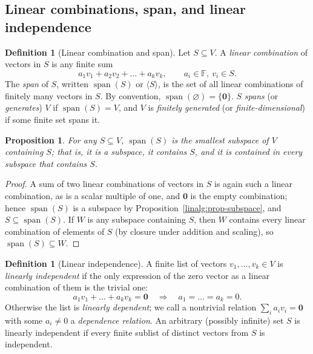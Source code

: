 \documentclass[11pt,a4paper]{article}
\newtheorem{proposition}[theorem]{Proposition}
\theoremstyle{definition}
\newtheorem{definition}[theorem]{Definition}
\theoremstyle{remark}
\newcommand{\F}{\ensuremath{\mathbb{F}}}
\begin{document}
\subsection{Linear combinations, span, and linear independence}\label{linalg:subsec-span}

\begin{definition}[Linear combination and span]\label{linalg:def-span}
Let \(S \subseteq V\). A \emph{linear combination} of vectors in \(S\) is any finite sum
\[
a_1 v_1 + a_2 v_2 + \dots + a_k v_k, \qquad a_i \in \F,\ v_i \in S.
\]
The \emph{span} of \(S\), written \(\operatorname{span}(S)\) or \(\langle S\rangle\), is the set of all linear combinations of finitely many vectors in \(S\). By convention, \(\operatorname{span}(\varnothing) = \{\mathbf 0\}\). \(S\) \emph{spans} (or \emph{generates}) \(V\) if \(\operatorname{span}(S) = V\), and \(V\) is \emph{finitely generated} (or \emph{finite-dimensional}) if some finite set spans it.
\end{definition}

\begin{proposition}\label{linalg:prop-span-subspace}
For any \(S \subseteq V\), \(\operatorname{span}(S)\) is the smallest subspace of \(V\) containing \(S\); that is, it is a subspace, it contains \(S\), and it is contained in every subspace that contains \(S\).
\end{proposition}

\begin{proof}
A sum of two linear combinations of vectors in \(S\) is again such a linear combination, as is a scalar multiple of one, and \(\mathbf 0\) is the empty combination; hence \(\operatorname{span}(S)\) is a subspace by Proposition~\ref{linalg:prop-subspace}, and \(S \subseteq \operatorname{span}(S)\). If \(W\) is any subspace containing \(S\), then \(W\) contains every linear combination of elements of \(S\) (by closure under addition and scaling), so \(\operatorname{span}(S) \subseteq W\).
\end{proof}

\begin{definition}[Linear independence]\label{linalg:def-indep}
A finite list of vectors \(v_1, \dots, v_k \in V\) is \emph{linearly independent} if the only expression of the zero vector as a linear combination of them is the trivial one:
\[
a_1 v_1 + \dots + a_k v_k = \mathbf 0 \quad\Longrightarrow\quad a_1 = \dots = a_k = 0.
\]
Otherwise the list is \emph{linearly dependent}; we call a nontrivial relation \(\sum_i a_i v_i = \mathbf 0\) with some \(a_i \neq 0\) a \emph{dependence relation}. An arbitrary (possibly infinite) set \(S\) is linearly independent if every finite sublist of distinct vectors from \(S\) is independent.
\end{definition}
\end{document}
